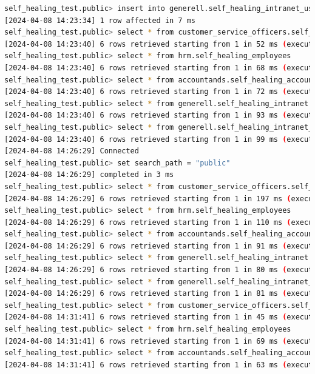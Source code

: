 \begin{flushleft}
\begin{lstlisting}[language=bash, caption=yugabyteDB - Evaluation-Testing,captionpos=b,label={lst:yugabytedb-evaluation-testing},breaklines=true]
self_healing_test.public> insert into generell.self_healing_intranet_users(intranet_user_id, employees_id) values(600, 600)
[2024-04-08 14:23:34] 1 row affected in 7 ms
self_healing_test.public> select * from customer_service_officers.self_healing_accounts
[2024-04-08 14:23:40] 6 rows retrieved starting from 1 in 52 ms (execution: 7 ms, fetching: 45 ms)
self_healing_test.public> select * from hrm.self_healing_employees
[2024-04-08 14:23:40] 6 rows retrieved starting from 1 in 68 ms (execution: 8 ms, fetching: 60 ms)
self_healing_test.public> select * from accountands.self_healing_accountand_protocol
[2024-04-08 14:23:40] 6 rows retrieved starting from 1 in 72 ms (execution: 7 ms, fetching: 65 ms)
self_healing_test.public> select * from generell.self_healing_intranet
[2024-04-08 14:23:40] 6 rows retrieved starting from 1 in 93 ms (execution: 8 ms, fetching: 85 ms)
self_healing_test.public> select * from generell.self_healing_intranet_users
[2024-04-08 14:23:40] 6 rows retrieved starting from 1 in 99 ms (execution: 6 ms, fetching: 93 ms)
[2024-04-08 14:26:29] Connected
self_healing_test.public> set search_path = "public"
[2024-04-08 14:26:29] completed in 3 ms
self_healing_test.public> select * from customer_service_officers.self_healing_accounts
[2024-04-08 14:26:29] 6 rows retrieved starting from 1 in 197 ms (execution: 21 ms, fetching: 176 ms)
self_healing_test.public> select * from hrm.self_healing_employees
[2024-04-08 14:26:29] 6 rows retrieved starting from 1 in 110 ms (execution: 11 ms, fetching: 99 ms)
self_healing_test.public> select * from accountands.self_healing_accountand_protocol
[2024-04-08 14:26:29] 6 rows retrieved starting from 1 in 91 ms (execution: 12 ms, fetching: 79 ms)
self_healing_test.public> select * from generell.self_healing_intranet
[2024-04-08 14:26:29] 6 rows retrieved starting from 1 in 80 ms (execution: 9 ms, fetching: 71 ms)
self_healing_test.public> select * from generell.self_healing_intranet_users
[2024-04-08 14:26:29] 6 rows retrieved starting from 1 in 81 ms (execution: 11 ms, fetching: 70 ms)
self_healing_test.public> select * from customer_service_officers.self_healing_accounts
[2024-04-08 14:31:41] 6 rows retrieved starting from 1 in 45 ms (execution: 8 ms, fetching: 37 ms)
self_healing_test.public> select * from hrm.self_healing_employees
[2024-04-08 14:31:41] 6 rows retrieved starting from 1 in 69 ms (execution: 8 ms, fetching: 61 ms)
self_healing_test.public> select * from accountands.self_healing_accountand_protocol
[2024-04-08 14:31:41] 6 rows retrieved starting from 1 in 63 ms (execution: 8 ms, fetching: 55 ms)

\end{lstlisting}
\end{flushleft}
